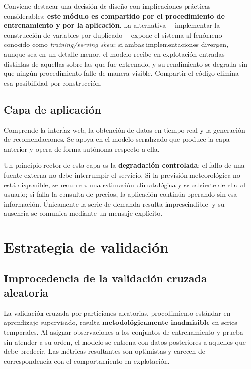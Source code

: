 Conviene destacar una decisión de diseño con implicaciones prácticas
considerables: \textbf{este módulo es compartido por el procedimiento de
entrenamiento y por la aplicación}. La alternativa —implementar la construcción de
variables por duplicado— expone el sistema al fenómeno conocido como
\textit{training/serving skew}: si ambas implementaciones divergen, aunque sea en
un detalle menor, el modelo recibe en explotación entradas distintas de aquellas
sobre las que fue entrenado, y su rendimiento se degrada sin que ningún
procedimiento falle de manera visible. Compartir el código elimina esa
posibilidad por construcción.

\subsection*{Capa de aplicación}

Comprende la interfaz web, la obtención de datos en tiempo real y la generación de
recomendaciones. Se apoya en el modelo serializado que produce la capa anterior y
opera de forma autónoma respecto a ella.

Un principio rector de esta capa es la \textbf{degradación controlada}: el fallo
de una fuente externa no debe interrumpir el servicio. Si la previsión
meteorológica no está disponible, se recurre a una estimación climatológica y se
advierte de ello al usuario; si falla la consulta de precios, la aplicación
continúa operando sin esa información. Únicamente la serie de demanda resulta
imprescindible, y su ausencia se comunica mediante un mensaje explícito.



\section{Estrategia de validación}
\label{sec:validacion}

\subsection*{Improcedencia de la validación cruzada aleatoria}

La validación cruzada por particiones aleatorias, procedimiento estándar en
aprendizaje supervisado, resulta \textbf{metodológicamente inadmisible} en series
temporales. Al asignar observaciones a los conjuntos de entrenamiento y prueba sin
atender a su orden, el modelo se entrena con datos posteriores a aquellos que debe
predecir. Las métricas resultantes son optimistas y carecen de correspondencia con
el comportamiento en explotación.

